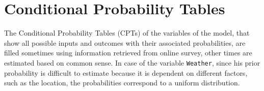 \documentclass[a4paper,12pt]{article} %
\begin{document}
\section{Conditional Probability Tables}

The Conditional Probability Tables (CPTs) of the variables of the model, that show all possible inputs and outcomes with their associated probabilities, are filled sometimes using information retrieved from online survey, other times are estimated based on common sense.
In case of the variable \texttt{Weather}, since his prior probability is difficult to estimate because it is dependent on different factors, such as the location, the probabilities correspond to a uniform distribution.
	

\begin{figure}[H]
	\begin{center}
		

\end{center}
\end{figure}
\end{document}
